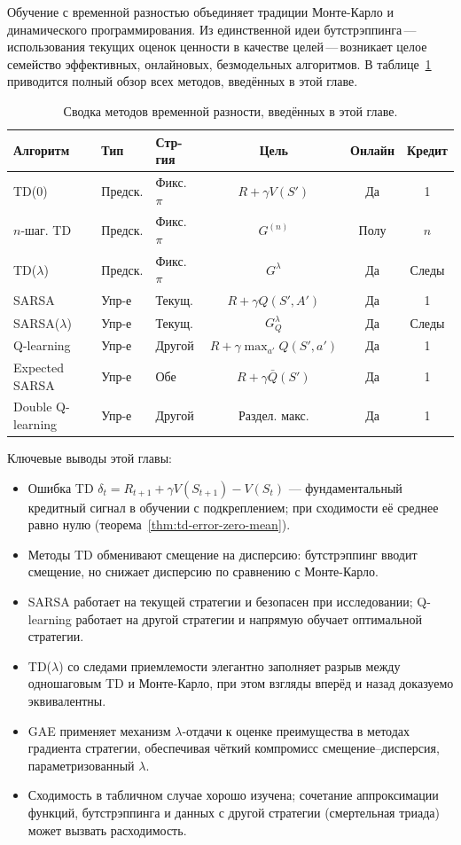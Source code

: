Обучение с временной разностью объединяет традиции Монте-Карло и динамического программирования.  Из единственной идеи бутстрэппинга\,---\,использования текущих оценок ценности в качестве целей\,---\,возникает целое семейство эффективных, онлайновых, безмодельных алгоритмов.  В таблице~\ref{tab:td-summary} приводится полный обзор всех методов, введённых в этой главе.

\begin{table}[ht]
\centering
\caption{Сводка методов временной разности, введённых в этой главе.}
\label{tab:td-summary}
\footnotesize
\begin{tabular}{@{}lllccc@{}}
\toprule
\textbf{Алгоритм} & \textbf{Тип} & \textbf{Стр-гия} & \textbf{Цель} & \textbf{Онлайн} & \textbf{Кредит}\\
\midrule
TD(0) & Предск. & Фикс. $\pi$ & $R+\gamma V(S')$ & Да & 1\\
$n$-шаг. TD & Предск. & Фикс. $\pi$ & $G^{(n)}$ & Полу & $n$\\
TD($\lambda$) & Предск. & Фикс. $\pi$ & $G^\lambda$ & Да & Следы\\
SARSA & Упр-е & Текущ. & $R+\gamma Q(S',A')$ & Да & 1\\
SARSA($\lambda$) & Упр-е & Текущ. & $G^\lambda_Q$ & Да & Следы\\
Q-learning & Упр-е & Другой & $R+\gamma\max_{a'}Q(S',a')$ & Да & 1\\
Expected SARSA & Упр-е & Обе & $R+\gamma\bar Q(S')$ & Да & 1\\
Double Q-learning & Упр-е & Другой & Раздел. макс. & Да & 1\\
\bottomrule
\end{tabular}
\end{table}

Ключевые выводы этой главы:
\begin{itemize}[leftmargin=*]
  \item Ошибка TD $\delta_t = R_{t+1}+\gamma V(S_{t+1})-V(S_t)$ --- фундаментальный кредитный сигнал в обучении с подкреплением; при сходимости её среднее равно нулю (теорема~\ref{thm:td-error-zero-mean}).
  \item Методы TD обменивают смещение на дисперсию: бутстрэппинг вводит смещение, но снижает дисперсию по сравнению с Монте-Карло.
  \item SARSA работает на текущей стратегии и безопасен при исследовании; Q-learning работает на другой стратегии и напрямую обучает оптимальной стратегии.
  \item TD($\lambda$) со следами приемлемости элегантно заполняет разрыв между одношаговым TD и Монте-Карло, при этом взгляды вперёд и назад доказуемо эквивалентны.
  \item GAE применяет механизм $\lambda$-отдачи к оценке преимущества в методах градиента стратегии, обеспечивая чёткий компромисс смещение--дисперсия, параметризованный $\lambda$.
  \item Сходимость в табличном случае хорошо изучена; сочетание аппроксимации функций, бутстрэппинга и данных с другой стратегии (смертельная триада) может вызвать расходимость.
\end{itemize}


